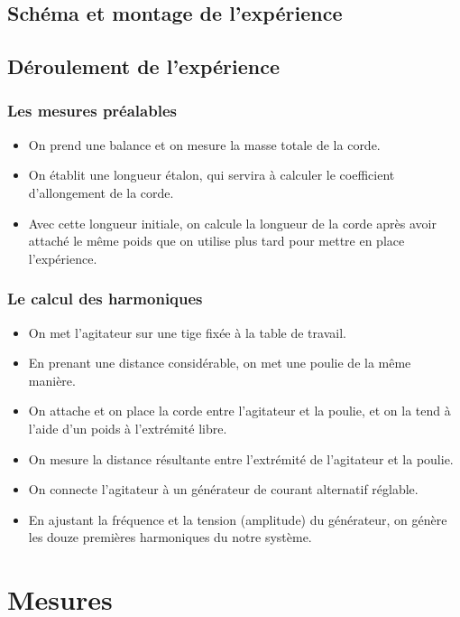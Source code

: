 \documentclass[12pt,a4paper]{article}
\begin{document}
    \subsection{Schéma et montage de l’expérience}
    \subsection{Déroulement de l'expérience}
    \subsubsection{Les mesures préalables}
    \begin{itemize}
        \item On prend une balance et on mesure la masse totale de la corde.
        \item On établit une longueur étalon, qui servira à calculer le coefficient d'allongement de la corde.
        \item Avec cette longueur initiale, on calcule la longueur de la corde après avoir attaché le même poids que on utilise plus tard pour mettre en place l'expérience.
    \end{itemize}
    \subsubsection{Le calcul des harmoniques}
    \begin{itemize}
        \item On met l'agitateur sur une tige fixée à la table de travail.
        \item En prenant une distance considérable, on met une poulie de la même manière.
        \item On attache et on place la corde entre l'agitateur et la poulie, et on la tend à l'aide d'un poids à l'extrémité libre.
        \item On mesure la distance résultante entre l'extrémité de l'agitateur et la poulie.
        \item On connecte l'agitateur à un générateur de courant alternatif réglable.
        \item En ajustant la fréquence et la tension (amplitude) du générateur, on génère les douze premières harmoniques du notre système.
    \end{itemize}
    \newpage
    \section{Mesures}
\end{document}
